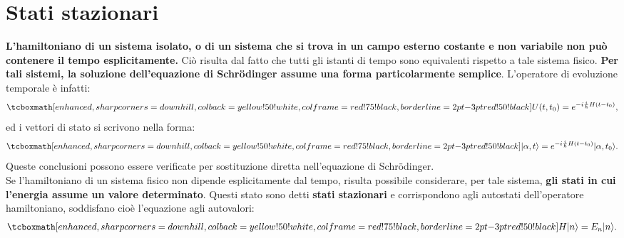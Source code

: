 \section[Stati stazionari]{Stati stazionari}
\textbf{L'hamiltoniano di un sistema isolato, o di un sistema che si trova in un campo esterno costante e non variabile non può contenere il tempo esplicitamente.} Ciò risulta dal fatto che tutti gli istanti di tempo sono equivalenti rispetto a tale sistema fisico. \textbf{Per tali sistemi, la soluzione dell'equazione di Schr\"{o}dinger assume una forma particolarmente semplice}. L'operatore di evoluzione temporale è infatti:
	\begin{equation}
		\tcboxmath[enhanced, sharp corners=downhill, colback=yellow!50!white, colframe=red!75!black, borderline={2pt}{-3pt}{red!50!black}]{
		U(t,t_0)= e^{-i\frac{i}{\hbar}H(t-t_0)},
		}
	\end{equation}
ed i vettori di stato si scrivono nella forma:
	\begin{equation}
		\tcboxmath[enhanced, sharp corners=downhill, colback=yellow!50!white, colframe=red!75!black, borderline={2pt}{-3pt}{red!50!black}]{
			\vert \alpha, t \rangle = e^{-i\frac{i}{\hbar}H(t-t_0)}\vert \alpha, t_0 \rangle.
			}
	\end{equation}
Queste conclusioni possono essere verificate per sostituzione diretta nell'equazione di Schr\"{o}dinger.\\

Se l'hamiltoniano di un sistema fisico non dipende esplicitamente dal tempo, risulta possibile considerare, per tale sistema, \textbf{gli stati in cui l'energia assume un valore determinato}. Questi stato sono detti \textbf{stati stazionari} e corrispondono agli autostati dell'operatore hamiltoniano, soddisfano cioè l'equazione agli autovalori:
	\begin{equation}
		\tcboxmath[enhanced, sharp corners=downhill, colback=yellow!50!white, colframe=red!75!black, borderline={2pt}{-3pt}{red!50!black}]{
			H|n\rangle = E_n |n \rangle.
			}
	\end{equation}\\
	
